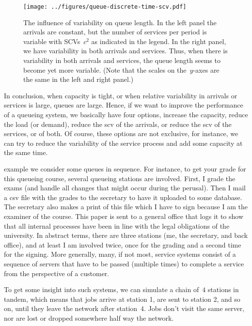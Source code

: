 \documentclass[stochastic-or.tex]{subfiles}
\begin{document}
\begin{figure}[tb]
\centering
  \texttt{[image: ../figures/queue-discrete-time-scv.pdf]}

  \caption{The influence of variability on queue length.
In the left panel the arrivals are constant, but the number of services per period is variable with SCVs~$c^{2}$ as indicated in the legend.
In the right panel, we have variability in both arrivals and services.
Thus, when there is variability in both arrivals and services, the queue length seems to become yet more variable.
(Note that the scales on the~$y$-axes are the same in the left and right panel.)}
\label{fig:scv}
\end{figure}

In conclusion, when capacity is tight, or when relative variability in arrivals or services is large, queues are large.
Hence, if we want to improve the performance of a queueing system, we basically have four options, increase the capacity, reduce the load (or demand), reduce the scv of the arrivals, or reduce the scv of the services, or of both.
Of course, these options are not exclusive, for instance, we can try to reduce the variability of the service process and add some capacity at the same time.



 example we consider some queues in sequence.
For instance, to get your grade for this queueing course, several queueing stations are involved.
First, I grade the exams (and handle all changes that might occur during the perusal).
Then I mail a csv file with the grades to the secretary to have it uploaded to some database.
The secretary also makes a print of this file which I have to sign because I am the examiner of the course.
This paper is sent to a general office that logs it to show that all internal processes have been in line with the legal obligations of the university.
In abstract terms, there are three stations (me, the secretary, and back office), and at least I am involved twice, once for the grading and a second time for the signing.
More generally, many, if not most, service systems consist of a sequence of servers that have to be passed (multiple times) to complete a service from the perspective of a customer.

To get some insight into such systems, we can simulate a chain of~$4$ stations in tandem, which means that jobs arrive at station 1, are sent to station 2, and so on, until they leave the network after station~$4$.
Jobs don't visit the same server, nor are lost or dropped somewhere half way the network.
\end{document}
